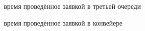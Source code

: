 \documentclass[12pt,a4paper]{report}
\begin{document}
\begin{figure}[h!]
	\caption{время проведённое заявкой в третьей очереди}
	\label{fig:image}
\end{figure}

\begin{figure}[h!]
	\caption{время проведённое заявкой в конвейере}
	\label{fig:image}
\end{figure}
\end{document}
